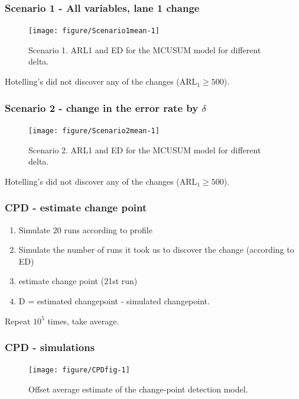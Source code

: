 \documentclass[10pt]{beamer}\usepackage[]{graphicx}\usepackage[]{color}
\newenvironment{knitrout}{}{} %
\begin{document}
\begin{frame}\frametitle{Scenario 1 - All variables, lane 1 change}
\begin{knitrout}
\color{fgcolor}\begin{figure}
\texttt{[image: figure/Scenario1mean-1]} \caption[Scenario 1]{Scenario 1. ARL1 and ED for the MCUSUM model for different delta. }\label{fig:Scenario1mean}
\end{figure}


\end{knitrout}
Hotelling's did not discover any of the changes (ARL$_1\geq 500$).
\end{frame}

\begin{frame}\frametitle{Scenario 2 - change in the error rate by $\delta$}
\begin{knitrout}
\color{fgcolor}\begin{figure}
\texttt{[image: figure/Scenario2mean-1]} \caption[Scenario 2]{Scenario 2. ARL1 and ED for the MCUSUM model for different delta.}\label{fig:Scenario2mean}
\end{figure}


\end{knitrout}
Hotelling's did not discover any of the changes (ARL$_1\geq 500$).
\end{frame}

\begin{frame}\frametitle{CPD - estimate change point}
\begin{enumerate}
\item Simulate 20 runs according to profile
\item Simulate the number of runs it took us to discover the change (according to ED)
\item estimate change point (21st run)
\item D = estimated changepoint - simulated changepoint.
\end{enumerate}
Repeat $10^5$ times, take average. 
\end{frame}

\begin{frame}\frametitle{CPD - simulations}
\begin{knitrout}
\color{fgcolor}\begin{figure}
\texttt{[image: figure/CPDfig-1]} \caption[Offset average estimate of the change-point detection model]{Offset average estimate of the change-point detection model.}\label{fig:CPDfig}
\end{figure}


\end{knitrout}
\end{frame}
\end{document}
